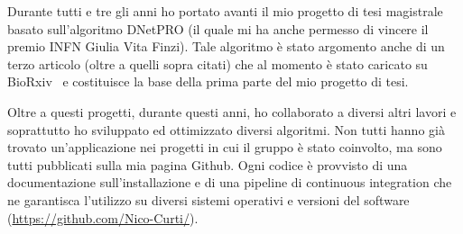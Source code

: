 \documentclass{standalone}
\begin{document}
Durante tutti e tre gli anni ho portato avanti il mio progetto di tesi magistrale basato sull'algoritmo DNetPRO (il quale mi ha anche permesso di vincere il premio INFN Giulia Vita Finzi).
Tale algoritmo è stato argomento anche di un terzo articolo (oltre a quelli sopra citati) che al momento è stato caricato su BioRxiv~\cite{Curti2019} e costituisce la base della prima parte del mio progetto di tesi.

Oltre a questi progetti, durante questi anni, ho collaborato a diversi altri lavori e soprattutto ho sviluppato ed ottimizzato diversi algoritmi.
Non tutti hanno già trovato un'applicazione nei progetti in cui il gruppo è stato coinvolto, ma sono tutti pubblicati sulla mia pagina Github.
Ogni codice è provvisto di una documentazione sull'installazione e di una pipeline di continuous integration che ne garantisca l'utilizzo su diversi sistemi operativi e versioni del software (\url{https://github.com/Nico-Curti/}).
\end{document}
